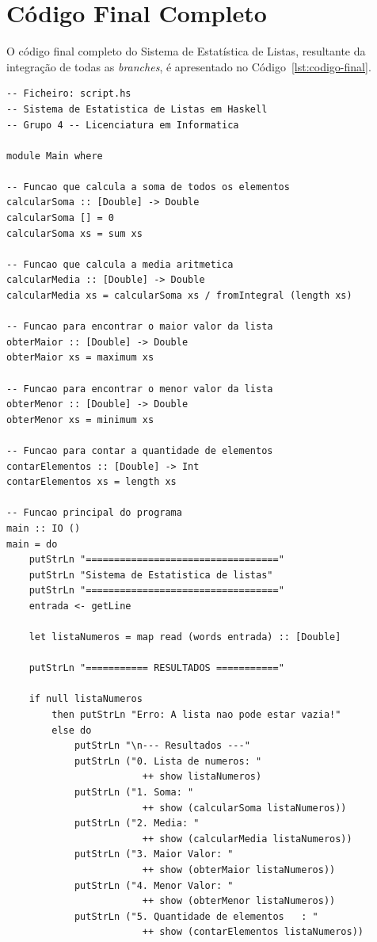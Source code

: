 \documentclass[12pt, a4paper, oneside]{report}
\begin{document}
\section{Código Final Completo}

O código final completo do Sistema de Estatística de Listas, resultante da integração de todas as \textit{branches}, é apresentado no Código~\ref{lst:codigo-final}.

\begin{lstlisting}[style=haskell, caption={Código final completo do Sistema de Estatística de Listas}, label=lst:codigo-final]
-- Ficheiro: script.hs
-- Sistema de Estatistica de Listas em Haskell
-- Grupo 4 -- Licenciatura em Informatica

module Main where

-- Funcao que calcula a soma de todos os elementos
calcularSoma :: [Double] -> Double
calcularSoma [] = 0
calcularSoma xs = sum xs

-- Funcao que calcula a media aritmetica
calcularMedia :: [Double] -> Double
calcularMedia xs = calcularSoma xs / fromIntegral (length xs)

-- Funcao para encontrar o maior valor da lista
obterMaior :: [Double] -> Double
obterMaior xs = maximum xs

-- Funcao para encontrar o menor valor da lista
obterMenor :: [Double] -> Double
obterMenor xs = minimum xs

-- Funcao para contar a quantidade de elementos
contarElementos :: [Double] -> Int
contarElementos xs = length xs

-- Funcao principal do programa
main :: IO ()
main = do
    putStrLn "=================================="
    putStrLn "Sistema de Estatistica de listas"
    putStrLn "=================================="
    entrada <- getLine

    let listaNumeros = map read (words entrada) :: [Double]

    putStrLn "=========== RESULTADOS ==========="

    if null listaNumeros
        then putStrLn "Erro: A lista nao pode estar vazia!"
        else do
            putStrLn "\n--- Resultados ---"
            putStrLn ("0. Lista de numeros: "
                        ++ show listaNumeros)
            putStrLn ("1. Soma: "
                        ++ show (calcularSoma listaNumeros))
            putStrLn ("2. Media: "
                        ++ show (calcularMedia listaNumeros))
            putStrLn ("3. Maior Valor: "
                        ++ show (obterMaior listaNumeros))
            putStrLn ("4. Menor Valor: "
                        ++ show (obterMenor listaNumeros))
            putStrLn ("5. Quantidade de elementos   : "
                        ++ show (contarElementos listaNumeros))
\end{lstlisting}
\end{document}
